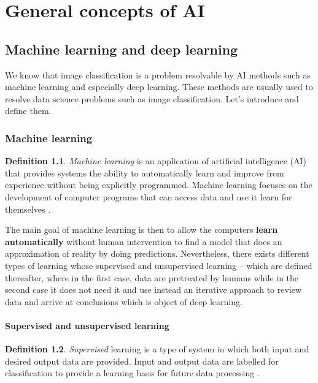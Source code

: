 \documentclass[11pt, openany]{report}
\theoremstyle{plain}
\theoremstyle{definition}
\newtheorem{defn}{Definition}[section]
\theoremstyle{remark}
\begin{document}
\chapter{General concepts of AI}

\section{Machine learning and deep learning}
We know that image classification is a problem resolvable by AI methods such as machine learning and especially deep learning. These methods are usually used to resolve data science problems such as image classification. Let's introduce and define them.

\subsection{Machine learning}

\begin{defn}
\textit{Machine learning} is an application of artificial intelligence (AI) that provides systems the ability to automatically learn and improve from experience without being explicitly programmed. Machine learning focuses on the development of computer programs that can access data and use it learn for themselves \cite{ML-1}. 
\end{defn}

The main goal of machine learning is then to allow the computers \textbf{learn automatically} without human intervention to find a model that does an approximation of reality by doing predictions. Nevertheless, there exists different types of learning whose supervised and unsupervised learning -- which are defined thereafter, where in the first case, data are pretreated by humans while in the second case it does not need it and use instead an iterative approach to review data and arrive at conclusions which is object of deep learning. 

\subsubsection{Supervised and unsupervised learning} \label{sec:supervised-unsupervised}

\begin{defn}
\textit{Supervised} learning is a type of system in which both input and desired output data are provided. Input and output data are labelled for classification to provide a learning basis for future data processing \cite{Supervised-1}. 
\end{defn}
\end{document}
